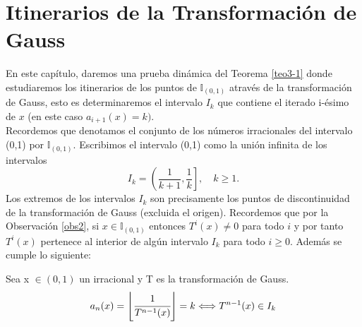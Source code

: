 \section{Itinerarios de la Transformación de Gauss}
En este capítulo, daremos una prueba dinámica del Teorema \ref{teo3-1} donde estudiaremos los itinerarios de los puntos de $\mathbb{I}_{(0,1)}$ através de la transformación de Gauss, esto es determinaremos el intervalo $I_{k}$ que contiene el iterado i-ésimo de $x$ (en este caso $a_{i+1}(x)=k)$.
 \\
 
Recordemos que denotamos el conjunto de los números irracionales del intervalo (0,1) por $\mathbb{I}_{(0,1)}.$ Escribimos el intervalo (0,1) como la unión infinita de los intervalos 
$$
I_{k}=\left(\frac{1}{k+1},\frac{1}{k}\right], \quad k\geq1.
$$
Los extremos de los intervalos $I_{k}$ son precisamente los puntos de discontinuidad de la transformación de Gauss (excluida el origen). Recordemos que por la Observación \ref{obs2}, si $x\in\mathbb{I}_{(0,1)}$ entonces $T^{i}(x)\neq0$ para todo $i$ y por tanto $T^{i}(x)$ pertenece al interior de algún intervalo $I_{k}$ para todo $i\geq0$. Además se cumple lo siguiente:

\begin{prop}
Sea x $\in (0,1)$ un irracional y T es la transformación de Gauss. 
$$
a_{n}(x)=\left\lfloor\cfrac{1}{T^{n-1}(x)}\right\rfloor=k \Longleftrightarrow T^{n-1}(x)\in I_{k}
$$

\end{prop}


